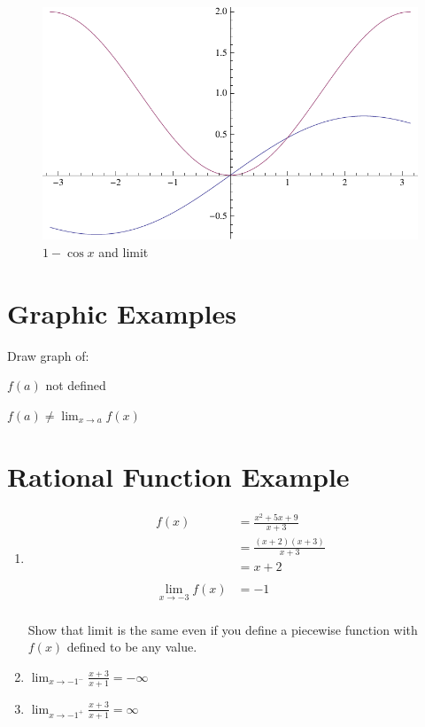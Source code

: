 \documentclass[letterpaper, landscape]{exam}
\begin{document}
  \begin{figure}[H]
    \centering
    \includegraphics[scale = 0.5]{example2.pdf}
    \caption{$1 - \cos x$ and limit}
    \label{fig:example2}
  \end{figure}

  \section{Graphic Examples}

  Draw graph of:
  \begin{itemize*}
    \item $f(a)$ not defined
    \item $f(a) \neq \lim_{x \to a} f(x)$
  \end{itemize*}

  \section{Rational Function Example}

  \begin{enumerate}
    \item 
      \begin{align*}
        f(x) & = \frac{x^2 + 5x + 9}{x + 3} \\
             & = \frac{(x + 2)(x + 3)}{x + 3} \\
             & = x + 2 \\
             \\
        \lim_{x \to -3} f(x) &= -1 \\
      \end{align*}

      Show that limit is the same even if you define a piecewise function with
      $f(x)$ defined to be any value.

    \item $\lim_{x \to -1^-} \frac{x + 3}{x + 1} = -\infty$

    \item $\lim_{x \to -1^+} \frac{x + 3}{x + 1} = \infty$

  \end{enumerate}
\end{document}
